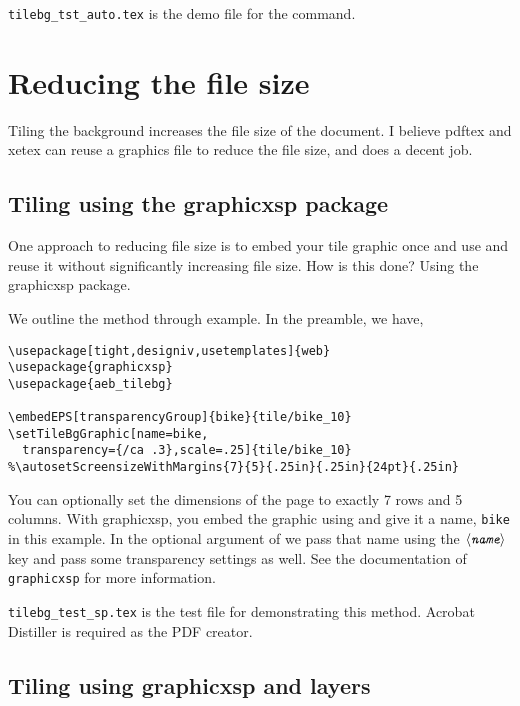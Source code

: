 \documentclass{article}
\def\meta#1{$\langle\textit{\texttt{#1}}\rangle$}
\let\amtIndent\parindent %
\begin{document}
 \texttt{tilebg\_tst\_auto.tex} is the demo file
for the  command.

\section{Reducing the file size}

Tiling the background increases the file size of the document. I believe
pdftex and xetex can reuse a graphics file to reduce the file size, and
does a decent job.

\subsection{Tiling using the \textsf{graphicxsp} package}

One approach to reducing file size is to embed your tile graphic once and
use and reuse it without significantly increasing file size. How is this
done? Using the \textsf{graphicxsp} package.

We outline the method through example. In the preamble, we have,
\begin{Verbatim}[xleftmargin=\amtIndent,fontsize=\small,commandchars=!()]
\usepackage[tight,designiv,usetemplates]{web}
\usepackage{graphicxsp}
\usepackage{aeb_tilebg}

\embedEPS[transparencyGroup]{bike}{tile/bike_10}
\setTileBgGraphic[name=bike,
  transparency={/ca .3},scale=.25]{tile/bike_10}
%\autosetScreensizeWithMargins{7}{5}{.25in}{.25in}{24pt}{.25in}
\end{Verbatim}
You can optionally set the dimensions of the page to exactly 7 rows and 5
columns. With \textsf{graphicxsp}, you embed the graphic using
 and give it a name, \texttt{bike} in this example. In the
optional argument of  we pass that name using the
\meta{name} key and pass some transparency settings as well. See the
documentation of \texttt{graphicxsp} for more information.

 \texttt{tilebg\_test\_sp.tex} is the test file for
demonstrating this method. Acrobat Distiller is required as the PDF
creator.

\subsection{Tiling using \textsf{graphicxsp} and layers}
\end{document}
